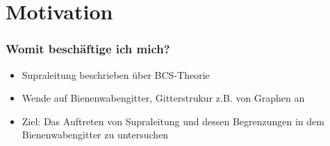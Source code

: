 \section{ Motivation }

\begin{frame}
	\frametitle{ Womit beschäftige ich mich? }
    \begin{itemize}
        \item Supraleitung beschrieben über BCS-Theorie 
        \item Wende auf Bienenwabengitter, Gitterstrukur z.B. von Graphen an
        \item Ziel: Das Auftreten von Supraleitung und dessen Begrenzungen in dem Bienenwabengitter zu untersuchen
    \end{itemize}
\end{frame}

